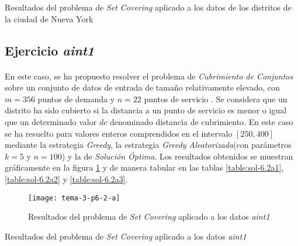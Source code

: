 \documentclass[spanish]{article}
\begin{document}
			\begin{table}[h]
				\begin{center}
				\end{center}
				\caption{Resultados del problema de \emph{Set Covering} aplicado a los datos de los distritos de la ciudad de Nueva York}
				\label{table:sol-6.1}
			\end{table}

		\subsection{Ejercicio \emph{aint1}}
		\label{sec:e-6.2a}

			\paragraph{}
			En este caso, se ha propuesto resolver el problema de \emph{Cubrimiento de Conjuntos} sobre un conjunto de datos de entrada de tamaño relativamente elevado, con $m = 356$ puntos de demanda y $n=22$ puntos de servicio . Se considera que un distrito ha sido cubierto si la distancia a un punto de servicio es menor o igual que un determinado valor $dc$ denominado distancia de cubrimiento. En este caso se ha resuelto para valores enteros comprendidos en el intervalo $[250, 400]$ mediante la estrategia \emph{Greedy}, la estrategia \emph{Greedy Aleatorizada}(con parámetros $k=5$ y $n=100$)  y la de \emph{Solución Óptima}. Los resultados obtenidos se muestran gráficamente en la figura \ref{fig:sol-6.2a} y de manera tabular en las tablas \ref{table:sol-6.2a1}, \ref{table:sol-6.2a2} y \ref{table:sol-6.2a3}.

			\begin{figure}[h]
				\begin{center}
					\texttt{[image: tema-3-p6-2-a]}
				\end{center}
				\caption{Resultados del problema de \emph{Set Covering} aplicado a los datos \emph{aint1}}
				\label{fig:sol-6.2a}
			\end{figure}

			\begin{table}[h]
				\begin{center}
				\end{center}
				\caption{Resultados del problema de \emph{Set Covering} aplicado a los datos \emph{aint1}}
				\label{table:sol-6.2a1}
			\end{table}
\end{document}
